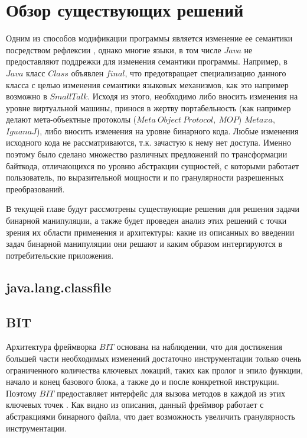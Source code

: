 \section{Обзор существующих решений}
\label{sec:Chapter2} 

Одним из способов модификации программы является изменение ее семантики посредством рефлексии \cite{compReflection}, однако многие языки, в том числе $Java$ не предоставляют поддрежки для изменения семантики программы. Например, в $Java$ класс $Class$ объявлен $final$, что предотвращает специализацию данного класса с целью изменения семантики языковых механизмов, как это например возможно в $SmallTalk$. Исходя из этого, необходимо либо вносить изменения на уровне виртуальной машины, принося в жертву портабельность (как например делают мета-объектные протоколы ($Meta~Object~Protocol,~MOP$) $Metaxa$, $IguanaJ$), либо вносить изменения на уровне бинарного кода. Любые изменения исходного кода не рассматриваются, т.к. зачастую к нему нет доступа. Именно поэтому было сделано множество различных предложений по трансформации байткода, отличающихся по уровню абстракции сущностей, с которыми работает пользователь, по выразительной мощности и по гранулярности разрешенных преобразований.

В текущей главе будут рассмотрены существующие решения для решения задачи бинарной манипуляции, а также будет проведен анализ этих решений с точки зрения их области применения и архитектуры: какие из описанных во введении задач бинарной манипуляции они решают и каким образом интергируются в потребительские приложения.

\subsection{java.lang.classfile}

\cite{lavaLangClassfile}

\subsection{BIT}

Архитектура фреймворка $BIT$ основана на наблюдении, что для достижения большей части необходимых изменений достаточно инструментации только очень ограниченного количества ключевых локаций, таких как пролог и эпило функции, начало и конец базового блока, а также до и после конкретной инструкции. Поэтому $BIT$ предоставляет интерфейс для вызова методов в каждой из этих ключевых точек \cite{bit}. Как видно из описания, данный фреймвор работает с абстракциями бинарного файла, что дает возможность увеличить гранулярность инструментации.

